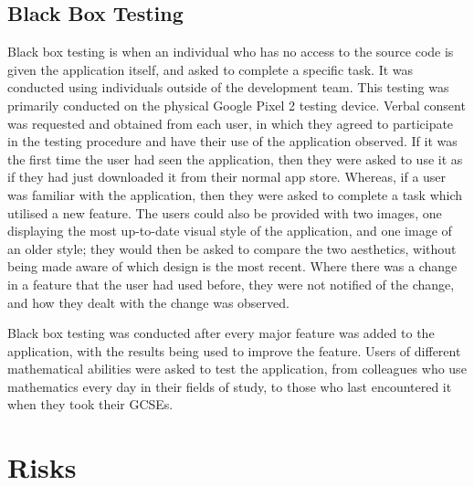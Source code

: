 \documentclass{article}
\begin{document}
\subsection{Black Box Testing}

Black box testing is when an individual who has no access to the source code is given the application itself, and asked to complete a specific task. It was conducted using individuals outside of the development team. This testing was primarily conducted on the physical Google Pixel 2 testing device. Verbal consent was requested and obtained from each user, in which they agreed to participate in the testing procedure and have their use of the application observed. If it was the first time the user had seen the application, then they were asked to use it as if they had just downloaded it from their normal app store. Whereas, if a user was familiar with the application, then they were asked to complete a task which utilised a new feature. The users could also be provided with two images, one displaying the most up-to-date visual style of the application, and one image of an older style; they would then be asked to compare the two aesthetics, without being made aware of which design is the most recent. Where there was a change in a feature that the user had used before, they were not notified of the change, and how they dealt with the change was observed. \par

Black box testing was conducted after every major feature was added to the application, with the results being used to improve the feature. Users of different mathematical abilities were asked to test the application, from colleagues who use mathematics every day in their fields of study, to those who last encountered it when they took their GCSEs. \par

\section{Risks}
\label{section:risks}
\end{document}
